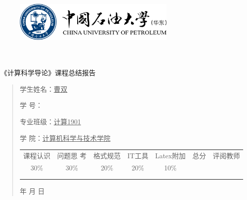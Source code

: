 \documentclass{article}
\renewcommand{\today}{\number\year 年 \number\month 月 \number\day 日}
\begin{document}
\begin{figure}
    \centering
    \includegraphics[width=8cm]{upc.png}

    \label{figupc}
\end{figure}

	\begin{center}
		\quad \\
		\quad \\
		\heiti \fontsize{45}{17} \quad \quad \quad 
		\vskip 1.5cm
		\heiti {} 《计算科学导论》课程总结报告
	\end{center}
	\vskip 2.0cm
		
	\begin{quotation}
		\doublespacing
		
        \par\setlength\parindent{7em}
		\quad 

		学生姓名：\underline{\qquad  曹双 \qquad \qquad}

		学\hspace{0.61cm} 号：\underline{\qquad}
		
		专业班级：\underline{\qquad 计算1901 \qquad  }
		
        学\hspace{0.61cm} 院：\underline{计算机科学与技术学院}
		\vskip 2cm
		\centering
		\begin{table}[h]
            \centering 
            \begin{tabular}{|c|c|c|c|c|c|c|}
                \hline
                课程认识 & 问题思 考 & 格式规范  & IT工具  & Latex附加  & 总分 & 评阅教师 \\
                30\% & 30\% & 20\% & 20\% & 10\% &  &  \\
                \hline
                 & & & & & &\\
                & & & & & &\\
                \hline
            \end{tabular}
        \end{table}
		\vskip 2cm
		\today
	\end{quotation}
\end{document}
